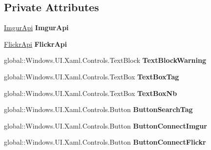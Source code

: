 \subsection*{Private Attributes}
\begin{DoxyCompactItemize}
\item 
\mbox{\label{classepicture_1_1_main_page_a0ee9be5edd32a622d3650cc28bd22069}} 
\mbox{\hyperlink{classepicture_1_1_imgur_api}{Imgur\+Api}} {\bfseries Imgur\+Api}
\item 
\mbox{\label{classepicture_1_1_main_page_a1a9b84824af16dcbae10c28555e7c7a7}} 
\mbox{\hyperlink{classepicture_1_1_flickr_api}{Flickr\+Api}} {\bfseries Flickr\+Api}
\item 
\mbox{\label{classepicture_1_1_main_page_adffd553f506a93152a88d075fca2a462}} 
global\+::\+Windows.\+U\+I.\+Xaml.\+Controls.\+Text\+Block {\bfseries Text\+Block\+Warning}
\item 
\mbox{\label{classepicture_1_1_main_page_a206120cf5027642cff943f1b1ffeba52}} 
global\+::\+Windows.\+U\+I.\+Xaml.\+Controls.\+Text\+Box {\bfseries Text\+Box\+Tag}
\item 
\mbox{\label{classepicture_1_1_main_page_a703be6189a1a0d89a5ab694faef62eb0}} 
global\+::\+Windows.\+U\+I.\+Xaml.\+Controls.\+Text\+Box {\bfseries Text\+Box\+Nb}
\item 
\mbox{\label{classepicture_1_1_main_page_a86ba2eb08c9857bf874b20e640ed2b62}} 
global\+::\+Windows.\+U\+I.\+Xaml.\+Controls.\+Button {\bfseries Button\+Search\+Tag}
\item 
\mbox{\label{classepicture_1_1_main_page_aedbb03c5cbc6333fb16dbc2d2e57159d}} 
global\+::\+Windows.\+U\+I.\+Xaml.\+Controls.\+Button {\bfseries Button\+Connect\+Imgur}
\item 
\mbox{\label{classepicture_1_1_main_page_a1cb464f71fa6d7d23aea30edd06c324a}} 
global\+::\+Windows.\+U\+I.\+Xaml.\+Controls.\+Button {\bfseries Button\+Connect\+Flickr}
\item 
\mbox{\label{classepicture_1_1_main_page_aefaef431a15018a496f89543b08c028d}} 

\end{DoxyCompactItemize}
